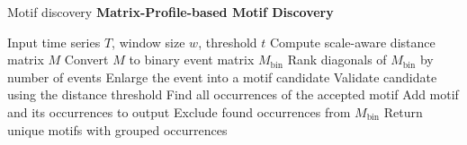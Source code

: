 \begin{frame}[allowframebreaks]{Motif discovery}
    \textbf{Matrix-Profile-based Motif Discovery \cite{vanonsem-2023-variable-length-motif-discovery-in-time-series-data}}
    \begin{algorithm}[H]
	\caption{Event-Driven Variable-Length Motif Discovery}
    \begin{algorithmic}[1]
        \State Input time series \(T\), window size \(w\), threshold \(t\)
        \State Compute scale-aware distance matrix \(M\)
        \State Convert \(M\) to binary event matrix \(M_{\mathrm{bin}}\)
        \State Rank diagonals of \(M_{\mathrm{bin}}\) by number of events
                \State Enlarge the event into a motif candidate
                \State Validate candidate using the distance threshold
                \State Find all occurrences of the accepted motif
                \State Add motif and its occurrences to output
                \State Exclude found occurrences from \(M_{\mathrm{bin}}\)
            \EndFor
        \EndFor
        \State Return unique motifs with grouped occurrences
    \end{algorithmic}
    \end{algorithm}
\end{frame}